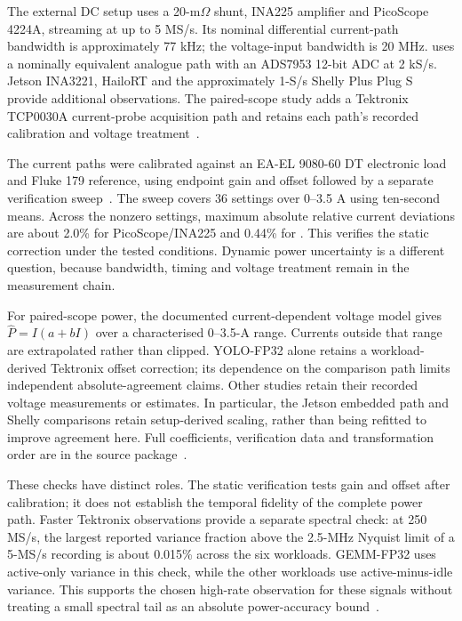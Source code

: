 The external DC setup uses a 20-m$\Omega$ shunt, INA225 amplifier and PicoScope 4224A, streaming at up to 5 MS/s. Its nominal differential current-path bandwidth is approximately 77 kHz; the voltage-input bandwidth is 20 MHz. \urecs{} uses a nominally equivalent analogue path with an ADS7953 12-bit ADC at 2 kS/s. Jetson INA3221, HailoRT and the approximately 1-S/s Shelly Plus Plug S provide additional observations. The paired-scope study adds a Tektronix TCP0030A current-probe acquisition path and retains each path's recorded calibration and voltage treatment~\cite{energyResults2026}.

The current paths were calibrated against an EA-EL 9080-60 DT electronic load and Fluke 179 reference, using endpoint gain and offset followed by a separate verification sweep~\cite{wachsmuth2026thesis}. The sweep covers 36 settings over 0--3.5 A using ten-second means. Across the nonzero settings, maximum absolute relative current deviations are about 2.0\% for PicoScope/INA225 and 0.44\% for \urecs{}. This verifies the static correction under the tested conditions. Dynamic power uncertainty is a different question, because bandwidth, timing and voltage treatment remain in the measurement chain.

For paired-scope power, the documented current-dependent voltage model gives $\widehat P=I(a+bI)$ over a characterised 0--3.5-A range. Currents outside that range are extrapolated rather than clipped. YOLO-FP32 alone retains a workload-derived Tektronix offset correction; its dependence on the comparison path limits independent absolute-agreement claims. Other studies retain their recorded voltage measurements or estimates. In particular, the Jetson embedded path and Shelly comparisons retain setup-derived scaling, rather than being refitted to improve agreement here. Full coefficients, verification data and transformation order are in the source package~\cite{energyResults2026}.

These checks have distinct roles. The static verification tests gain and offset after calibration; it does not establish the temporal fidelity of the complete power path. Faster Tektronix observations provide a separate spectral check: at 250 MS/s, the largest reported variance fraction above the 2.5-MHz Nyquist limit of a 5-MS/s recording is about 0.015\% across the six workloads. GEMM-FP32 uses active-only variance in this check, while the other workloads use active-minus-idle variance. This supports the chosen high-rate observation for these signals without treating a small spectral tail as an absolute power-accuracy bound~\cite{energyResults2026}.


